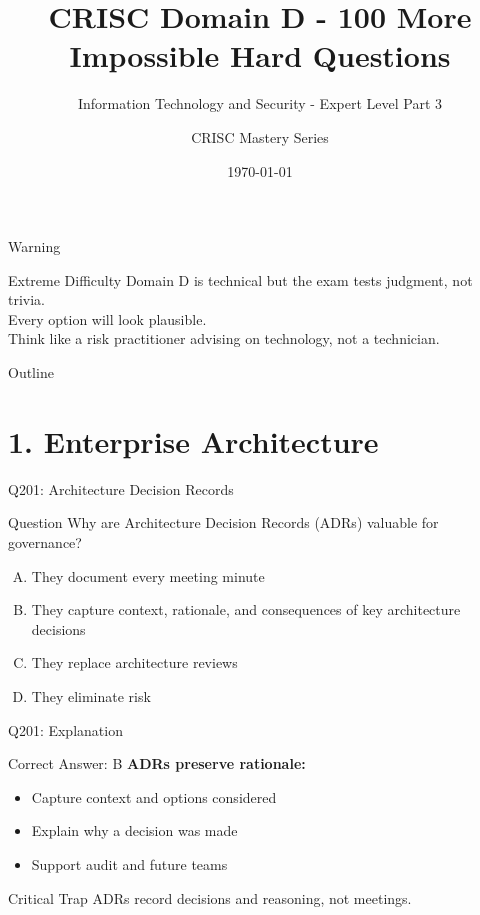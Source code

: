 \documentclass{beamer}
\title{CRISC Domain D - 100 More Impossible Hard Questions}
\subtitle{Information Technology and Security - Expert Level Part 3}
\author{CRISC Mastery Series}
\date{\today}
\begin{document}
	
	\begin{frame}
		\titlepage
	\end{frame}
	
	\begin{frame}{Warning}
		\begin{alertblock}{Extreme Difficulty}
			Domain D is technical but the exam tests judgment, not trivia.\\
			Every option will look plausible.\\
			Think like a risk practitioner advising on technology, not a technician.
		\end{alertblock}
	\end{frame}
	
	\begin{frame}{Outline}
		\tableofcontents
	\end{frame}
	
	\section{1. Enterprise Architecture}
	
	\begin{frame}{Q201: Architecture Decision Records}
		\begin{block}{Question}
			Why are Architecture Decision Records (ADRs) valuable for governance?
		\end{block}
		\begin{enumerate}[(A)]
			\item They document every meeting minute
			\item They capture context, rationale, and consequences of key architecture decisions
			\item They replace architecture reviews
			\item They eliminate risk
		\end{enumerate}
	\end{frame}
	
	\begin{frame}{Q201: Explanation}
		\begin{block}{Correct Answer: B}
			\textbf{ADRs preserve rationale:}
			\begin{itemize}
				\item Capture context and options considered
				\item Explain why a decision was made
				\item Support audit and future teams
			\end{itemize}
		\end{block}
		\begin{alertblock}{Critical Trap}
			ADRs record decisions and reasoning, not meetings.
		\end{alertblock}
	\end{frame}
	
\end{document}
